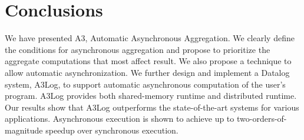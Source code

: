 \section{Conclusions}
\label{sec:conclusion}

We have presented A3, Automatic Asynchronous Aggregation. We clearly define the conditions for asynchronous aggregation and propose to prioritize the aggregate computations that most affect result. We also propose a technique to allow automatic asynchronization. We further design and implement a Datalog system, A3Log, to support automatic asynchronous computation of the user's program. A3Log provides both shared-memory runtime and distributed runtime. Our results show that A3Log outperforms the state-of-the-art systems for various applications. Asynchronous execution is shown to achieve up to two-orders-of-magnitude speedup over synchronous execution.

\pagebreak
